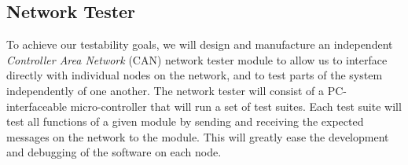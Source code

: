 \subsection{Network Tester}

To achieve our testability goals, we will design and manufacture an independent \emph{Controller Area Network} (CAN) network tester module to allow us to interface directly with individual nodes on the network, and to test parts of the system independently of one another. The network tester will consist of a PC-interfaceable micro-controller that will run a set of test suites. Each test suite will test all functions of a given module by sending and receiving the expected messages on the network to the module. This will greatly ease the development and debugging of the software on each node.